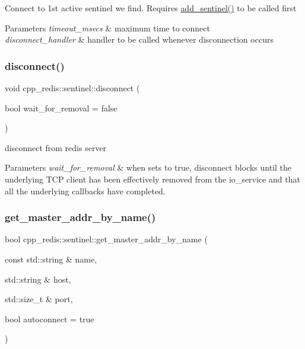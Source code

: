 Connect to 1st active sentinel we find. Requires \hyperlink{classcpp__redis_1_1sentinel_a548dad45711dc2e7da7e0803d5a74a2e}{add\+\_\+sentinel()} to be called first


\begin{DoxyParams}{Parameters}
{\em timeout\+\_\+msecs} & maximum time to connect \\
\hline
{\em disconnect\+\_\+handler} & handler to be called whenever disconnection occurs \\
\hline
\end{DoxyParams}
\mbox{\label{classcpp__redis_1_1sentinel_af607d8c5a20ada35daad251f1b1b2f68}} 
\subsubsection{\texorpdfstring{disconnect()}{disconnect()}}
{\footnotesize\ttfamily void cpp\+\_\+redis\+::sentinel\+::disconnect (\begin{DoxyParamCaption}\item[{bool}]{wait\+\_\+for\+\_\+removal = {\ttfamily false} }\end{DoxyParamCaption})}

disconnect from redis server


\begin{DoxyParams}{Parameters}
{\em wait\+\_\+for\+\_\+removal} & when sets to true, disconnect blocks until the underlying T\+CP client has been effectively removed from the io\+\_\+service and that all the underlying callbacks have completed. \\
\hline
\end{DoxyParams}
\mbox{\label{classcpp__redis_1_1sentinel_a2886493b40b00dfafdd3b22dfe28e0c3}} 
\subsubsection{\texorpdfstring{get\+\_\+master\+\_\+addr\+\_\+by\+\_\+name()}{get\_master\_addr\_by\_name()}}
{\footnotesize\ttfamily bool cpp\+\_\+redis\+::sentinel\+::get\+\_\+master\+\_\+addr\+\_\+by\+\_\+name (\begin{DoxyParamCaption}\item[{const std\+::string \&}]{name,  }\item[{std\+::string \&}]{host,  }\item[{std\+::size\+\_\+t \&}]{port,  }\item[{bool}]{autoconnect = {\ttfamily true} }\end{DoxyParamCaption})}

